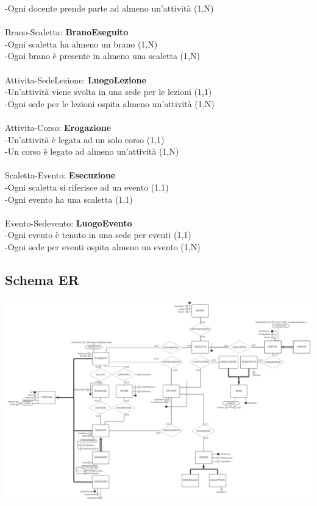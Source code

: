 \documentclass[11pt]{article}
\begin{document}
		-Ogni docente prende parte ad almeno un'attività (1,N)\\
		\\
		Brano-Scaletta: \textbf{BranoEseguito}\\
		-Ogni scaletta ha almeno un brano (1,N)\\
		-Ogni brano è presente in almeno una scaletta (1,N)\\
		\\
		Attivita-SedeLezione: \textbf{LuogoLezione}\\
		-Un'attività viene svolta in una sede per le lezioni (1,1)\\
		-Ogni sede per le lezioni ospita almeno un'attività (1,N)\\
		\\
		Attivita-Corso: \textbf{Erogazione}\\
		-Un'attività è legata ad un solo corso (1,1)\\
		-Un corso è legato ad almeno un'attività (1,N)\\
		\\
		Scaletta-Evento: \textbf{Esecuzione}\\
		-Ogni scaletta si riferisce ad un evento (1,1)\\
		-Ogni evento ha una scaletta (1,1)\\
		\\
		Evento-Sedevento: \textbf{LuogoEvento}\\
		-Ogni evento è tenuto in una sede per eventi (1,1)\\
		-Ogni sede per eventi ospita almeno un evento (1,N)\\
	\subsection{Schema ER}
		\includegraphics[scale=0.6]{../SchemaConcettuale/ER-LUCIDCHART - ER-concettuale 1.jpeg}
\end{document}
